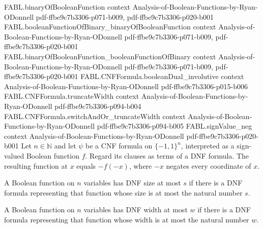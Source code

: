 \begin{theorem}
\proofstep
  {FABL.binaryOfBooleanFunction}
  {context}
  {Analysis-of-Boolean-Functions-by-Ryan-ODonnell}
  {pdf-ffbe9c7b3306-p071-b009,
    pdf-ffbe9c7b3306-p020-b001}
\proofstep
  {FABL.booleanFunctionOfBinary_binaryOfBooleanFunction}
  {context}
  {Analysis-of-Boolean-Functions-by-Ryan-ODonnell}
  {pdf-ffbe9c7b3306-p071-b009,
    pdf-ffbe9c7b3306-p020-b001}
\proofstep
  {FABL.binaryOfBooleanFunction_booleanFunctionOfBinary}
  {context}
  {Analysis-of-Boolean-Functions-by-Ryan-ODonnell}
  {pdf-ffbe9c7b3306-p071-b009,
    pdf-ffbe9c7b3306-p020-b001}
\proofstep
  {FABL.CNFFormula.booleanDual_involutive}
  {context}
  {Analysis-of-Boolean-Functions-by-Ryan-ODonnell}
  {pdf-ffbe9c7b3306-p015-b006}
\proofstep
  {FABL.CNFFormula.truncateWidth}
  {context}
  {Analysis-of-Boolean-Functions-by-Ryan-ODonnell}
  {pdf-ffbe9c7b3306-p094-b004}
\proofstep
  {FABL.CNFFormula.switchAndOr_truncateWidth}
  {context}
  {Analysis-of-Boolean-Functions-by-Ryan-ODonnell}
  {pdf-ffbe9c7b3306-p094-b005}
\proofstep
  {FABL.signValue_neg}
  {context}
  {Analysis-of-Boolean-Functions-by-Ryan-ODonnell}
  {pdf-ffbe9c7b3306-p020-b001}
Let $n\in\mathbb{N}$ and let $\psi$ be a CNF formula on $\{-1,1\}^n$, interpreted as a
sign-valued Boolean function $f$. Regard its clauses as terms of a DNF formula. The
resulting function at $x$ equals $-f(-x)$, where $-x$ negates every coordinate of $x$.
\end{theorem}

\begin{definition}
\label{FABL.HasDNFSizeLE}
\leanok
{}
A Boolean function on $n$ variables has DNF size at most $s$ if there is a DNF formula
representing that function whose size is at most the natural number $s$.
\end{definition}

\begin{definition}
\label{FABL.HasDNFWidthLE}
\leanok
{}
A Boolean function on $n$ variables has DNF width at most $w$ if there is a DNF formula
representing that function whose width is at most the natural number $w$.
\end{definition}

